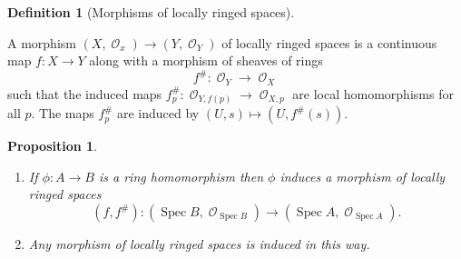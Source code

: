 \documentclass[10pt,]{book}
\theoremstyle{plain}
\newtheorem{proposition}[theorem]{Proposition}
\theoremstyle{definition}
\newtheorem{definition}[theorem]{Definition}
\numberwithin{equation}{section}
\DeclareMathOperator{\sO}{\mathcal{O}}
\DeclareMathOperator{\Spec}{Spec}
\begin{document}
\begin{definition}[Morphisms of locally ringed spaces]\label{definition-6}

            A morphism \((X,\sO_x) \to (Y,\sO_Y)\) of locally ringed spaces is a continuous map \(f\colon X \to Y\) along with a morphism of sheaves of rings 
            \[
              f^\# \colon \sO_Y \to \sO_X
            \]
            such that the induced maps \(f_p^\# \colon \sO_{Y,f(p)} \to \sO_{X,p}\) are local homomorphisms for all \(p\).
            The maps \(f_p^\#\) are induced by \((U,s) \mapsto (U,f^\#(s))\). \end{definition}
\begin{proposition}\label{proposition-2}
\begin{enumerate}
\item{}If \(\phi\colon A \to B\) is a ring homomorphism then \(\phi\) induces a morphism of locally ringed spaces \[(f,f^\#)\colon (\Spec B, \sO_{\Spec B}) \to (\Spec A, \sO_{\Spec A}).\]\item{}Any morphism of locally ringed spaces is induced in this way.\end{enumerate}
\end{proposition}
\end{document}

